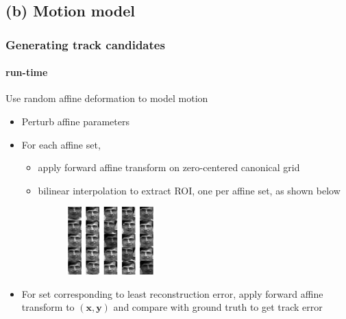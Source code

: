 \subsection{(b) Motion model}
\begin{frame}
\frametitle{Generating track candidates}
\framesubtitle{run-time}
\logoCSIPCPL\mypagenum
Use random affine deformation to model motion
\begin{itemize}
\item Perturb affine parameters
\item For each affine set, 
\begin{itemize}
\item apply forward affine transform on zero-centered canonical grid 
\item bilinear interpolation to extract ROI, one per affine set, as shown below
\begin{figure}[t]
\centering
\includegraphics[width=0.35\textwidth]{thesis/affineCandidates.pdf}
\label{Fig:affine_candidates}
\end{figure}
\end{itemize}
\item For set corresponding to least reconstruction error, apply forward affine transform to $(\mathbf{x, y})$ and compare with ground truth to get track error
\end{itemize}
\end{frame}








